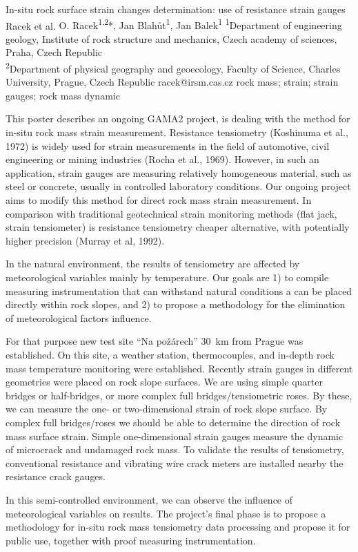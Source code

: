 \abstract
{In-situ rock surface strain changes determination: use of resistance strain gauges} 
{Racek et al.} 
{O. Racek\textsuperscript{1,2}*, Jan Blahůt\textsuperscript{1}, Jan Balek\textsuperscript{1}} 
{\POtag} 
{
\textsuperscript{1}Department of engineering geology, Institute of rock structure and mechanics, Czech academy of sciences, Praha, Czech Republic\\
\textsuperscript{2}Department of physical geography and geoecology, Faculty of Science, Charles University, Prague, Czech Republic
}
{racek@irsm.cas.cz}  %
{rock mass; strain; strain gauges; rock mass dynamic}
{This poster describes an ongoing GAMA2 project, is dealing with the method for in-situ rock mass strain measurement. Resistance tensiometry (Koshinuma et al., 1972) is widely used for strain measurements in the field of automotive, civil engineering or mining industries (Rocha et al., 1969). However, in such an application, strain gauges are measuring relatively homogeneous material, such as steel or concrete, usually in controlled laboratory conditions. Our ongoing project aims to modify this method for direct rock mass strain measurement. In comparison with traditional geotechnical strain monitoring methods (flat jack, strain tensiometer) is resistance tensiometry cheaper alternative, with potentially higher precision (Murray et al, 1992).

In the natural environment, the results of tensiometry are affected by meteorological variables mainly by temperature. Our goals are 1) to compile measuring instrumentation that can withstand natural conditions a can be placed directly within rock slopes, and 2) to propose a methodology for the elimination of meteorological factors influence. 

For that purpose new test site \enquote{Na požárech} 30~km from Prague was established. On this site, a weather station, thermocouples, and in-depth rock mass temperature monitoring were established. Recently strain gauges in different geometries were placed on rock slope surfaces. We are using simple quarter bridges or half-bridges, or more complex full bridges/tensiometric roses. By these, we can measure the one- or two-dimensional strain of rock slope surface. By complex full bridges/roses we should be able to determine the direction of rock mass surface strain. Simple one-dimensional strain gauges measure the dynamic of microcrack and undamaged rock mass. To validate the results of tensiometry, conventional resistance and vibrating wire crack meters are installed nearby the resistance crack gauges. 

In this semi-controlled environment, we can observe the influence of meteorological variables on results. The project’s final phase is to propose a methodology for in-situ rock mass tensiometry data processing and propose it for public use, together with proof measuring instrumentation. 
}
